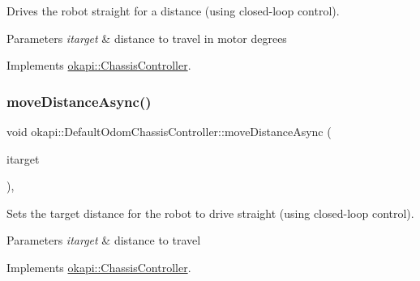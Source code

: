 Drives the robot straight for a distance (using closed-\/loop control).


\begin{DoxyParams}{Parameters}
{\em itarget} & distance to travel in motor degrees \\
\hline
\end{DoxyParams}


Implements \mbox{\hyperlink{classokapi_1_1ChassisController_a58619e777fd1b3f8e1aae871d46a8ccf}{okapi\+::\+Chassis\+Controller}}.

\mbox{\label{classokapi_1_1DefaultOdomChassisController_a61ca0d303fcbfd08932157af9adbbb12}} 
\subsubsection{\texorpdfstring{moveDistanceAsync()}{moveDistanceAsync()}\hspace{0.1cm}{\footnotesize\ttfamily [1/2]}}
{\footnotesize\ttfamily void okapi\+::\+Default\+Odom\+Chassis\+Controller\+::move\+Distance\+Async (\begin{DoxyParamCaption}\item[{Q\+Length}]{itarget }\end{DoxyParamCaption})\hspace{0.3cm}{\ttfamily [override]}, {\ttfamily [virtual]}}

Sets the target distance for the robot to drive straight (using closed-\/loop control).


\begin{DoxyParams}{Parameters}
{\em itarget} & distance to travel \\
\hline
\end{DoxyParams}


Implements \mbox{\hyperlink{classokapi_1_1ChassisController_a67a17268b871a4f1ae74d67891cbf5dd}{okapi\+::\+Chassis\+Controller}}.

\mbox{\label{classokapi_1_1DefaultOdomChassisController_ab1abaec33ecce2515895d3a8af363c8c}} 
